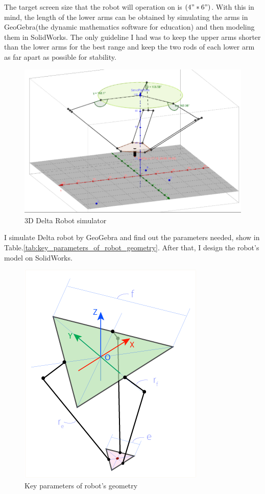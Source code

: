 The target screen size that the robot will operation on is $(4" \ast 6")$. With this in mind, the length of the lower arms can be obtained by simulating the arms in GeoGebra\cite{GeoGebra_thesis}(the dynamic mathematics software for education) and then modeling them in SolidWorks. The only guideline I had was to keep the upper arms shorter than the lower arms for the best range and keep the two rods of each lower arm as far apart as possible for stability.
\begin{figure}[H]	
	\centering
	\includegraphics[width=\maxwidth{15cm}, keepaspectratio]{Chapters/Fig/3D_delta_robot_simulator.png}
	\caption{3D Delta Robot simulator\cite{GeoGebra_deltarobot_simulator_thesis}}
	\label{fig:3D_delta_robot_simulator}
\end{figure}

I simulate Delta robot by GeoGebra and find out the parameters needed, show in Table.\ref{tab:key_parameters_of_robot_geometry}. After that, I design the robot's model on SolidWorks.
\begin{figure}[H]
	\centering
	\includegraphics[width=\maxwidth{10cm}, keepaspectratio]{Chapters/Fig/key_parameters.png}
	\caption{Key parameters of robot's geometry}
	\label{fig:key_parameters_value}
\end{figure}

